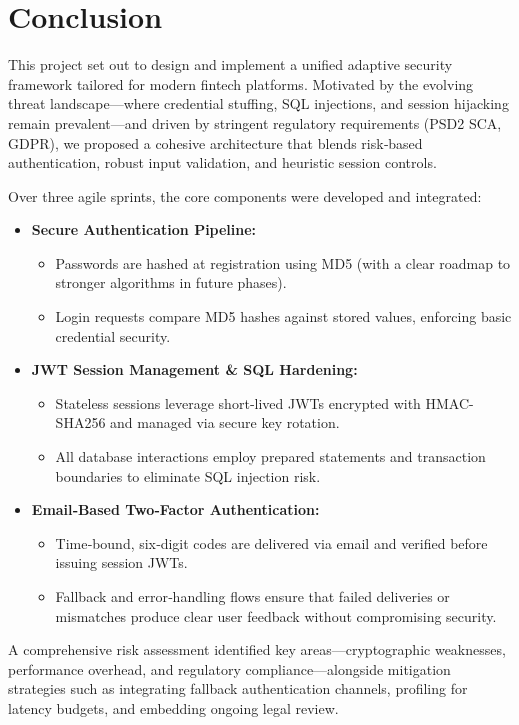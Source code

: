 \chapter{Conclusion}

This project set out to design and implement a unified adaptive security framework tailored for modern fintech platforms. Motivated by the evolving threat landscape—where credential stuffing, SQL injections, and session hijacking remain prevalent—and driven by stringent regulatory requirements (PSD2 SCA, GDPR), we proposed a cohesive architecture that blends risk‑based authentication, robust input validation, and heuristic session controls.

Over three agile sprints, the core components were developed and integrated:

\begin{itemize}
  \item \textbf{Secure Authentication Pipeline:}  
    \begin{itemize}
      \item Passwords are hashed at registration using MD5 (with a clear roadmap to stronger algorithms in future phases).
      \item Login requests compare MD5 hashes against stored values, enforcing basic credential security.
    \end{itemize}
  \item \textbf{JWT Session Management \& SQL Hardening:}  
    \begin{itemize}
      \item Stateless sessions leverage short‑lived JWTs encrypted with HMAC-SHA256 and managed via secure key rotation.
      \item All database interactions employ prepared statements and transaction boundaries to eliminate SQL injection risk.
    \end{itemize}
  \item \textbf{Email‑Based Two‑Factor Authentication:}  
    \begin{itemize}
      \item Time‑bound, six‑digit codes are delivered via email and verified before issuing session JWTs.
      \item Fallback and error‑handling flows ensure that failed deliveries or mismatches produce clear user feedback without compromising security.
    \end{itemize}
\end{itemize}

A comprehensive risk assessment identified key areas—cryptographic weaknesses, performance overhead, and regulatory compliance—alongside mitigation strategies such as integrating fallback authentication channels, profiling for latency budgets, and embedding ongoing legal review.

